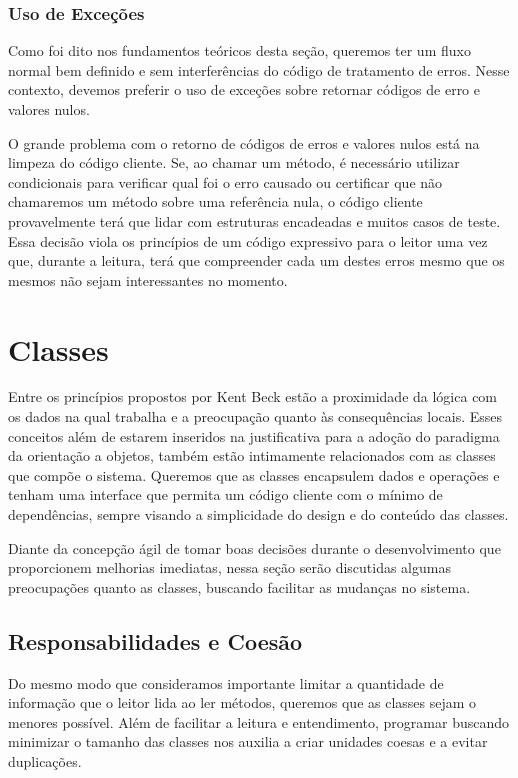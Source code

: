 \subsubsection{Uso de Exceções}
\label{metodos:excecoes}
Como foi dito nos fundamentos teóricos desta seção, queremos ter um fluxo normal bem definido e sem interferências do código de tratamento de erros. Nesse contexto, devemos preferir o uso de exceções sobre retornar códigos de erro e valores nulos.
	
O grande problema com o retorno de códigos de erros e valores nulos está na limpeza do código cliente. Se, ao chamar um método, é necessário utilizar condicionais para verificar qual foi o erro causado ou certificar que não chamaremos um método sobre uma referência nula, o código cliente provavelmente terá que lidar com estruturas encadeadas e muitos casos de teste. Essa decisão viola os princípios de um código expressivo para o leitor uma vez que, durante a leitura, terá que compreender cada um destes erros mesmo que os mesmos não sejam interessantes no momento.

\section{Classes}
\label{sec:classes}

Entre os princípios propostos por Kent Beck estão a proximidade da lógica com os dados na qual trabalha e a preocupação quanto às consequências locais. Esses conceitos além de estarem inseridos na justificativa para a adoção do paradigma da orientação a objetos, também estão intimamente relacionados com as classes que compõe o sistema. Queremos que as classes encapsulem dados e operações e tenham uma interface que permita um código cliente com o mínimo de dependências, sempre visando a simplicidade do design e do conteúdo das classes.
	
Diante da concepção ágil de tomar boas decisões durante o desenvolvimento que proporcionem melhorias imediatas, nessa seção serão discutidas algumas preocupações quanto as classes, buscando facilitar as mudanças no sistema.

\subsection{Responsabilidades e Coesão}
Do mesmo modo que consideramos importante limitar a quantidade de informação que o leitor lida ao ler métodos, queremos que as classes sejam o menores possível. Além de facilitar a leitura e entendimento, programar buscando minimizar o tamanho das classes nos auxilia a criar unidades coesas e a evitar duplicações. 
	
